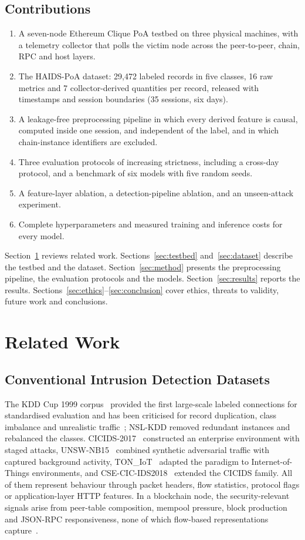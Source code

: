 \documentclass[journal]{IEEEtran}
\begin{document}
\subsection{Contributions}
\begin{enumerate}
\item A seven-node Ethereum Clique PoA testbed on three physical machines, with a telemetry collector that polls the victim node across the peer-to-peer, chain, RPC and host layers.
\item The HAIDS-PoA dataset: 29{,}472 labeled records in five classes, 16 raw metrics and 7 collector-derived quantities per record, released with timestamps and session boundaries (35 sessions, six days).
\item A leakage-free preprocessing pipeline in which every derived feature is causal, computed inside one session, and independent of the label, and in which chain-instance identifiers are excluded.
\item Three evaluation protocols of increasing strictness, including a cross-day protocol, and a benchmark of six models with five random seeds.
\item A feature-layer ablation, a detection-pipeline ablation, and an unseen-attack experiment.
\item Complete hyperparameters and measured training and inference costs for every model.
\end{enumerate}

Section~\ref{sec:related} reviews related work. Sections~\ref{sec:testbed} and~\ref{sec:dataset} describe the testbed and the dataset. Section~\ref{sec:method} presents the preprocessing pipeline, the evaluation protocols and the models. Section~\ref{sec:results} reports the results. Sections~\ref{sec:ethics}--\ref{sec:conclusion} cover ethics, threats to validity, future work and conclusions.

\section{Related Work}\label{sec:related}
\subsection{Conventional Intrusion Detection Datasets}
The KDD Cup 1999 corpus~\cite{kdd99} provided the first large-scale labeled connections for standardised evaluation and has been criticised for record duplication, class imbalance and unrealistic traffic~\cite{tavallaee2009}; NSL-KDD removed redundant instances and rebalanced the classes. CICIDS-2017~\cite{sharafaldin2018} constructed an enterprise environment with staged attacks, UNSW-NB15~\cite{moustafa2015} combined synthetic adversarial traffic with captured background activity, TON\_IoT~\cite{alsaedi2020} adapted the paradigm to Internet-of-Things environments, and CSE-CIC-IDS2018~\cite{cicids2018} extended the CICIDS family. All of them represent behaviour through packet headers, flow statistics, protocol flags or application-layer HTTP features. In a blockchain node, the security-relevant signals arise from peer-table composition, mempool pressure, block production and JSON-RPC responsiveness, none of which flow-based representations capture~\cite{buczak2016}.
\end{document}

